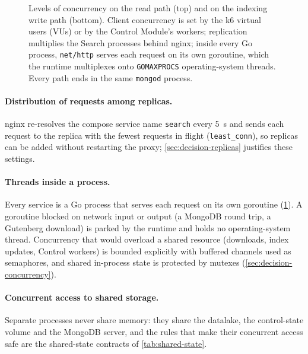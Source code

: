 \documentclass[10pt,a4paper]{article}
\newcommand{\code}[1]{\texttt{#1}}
\begin{document}
\begin{figure}[htbp]
  \caption{Levels of concurrency on the read path (top) and on the indexing
  write path (bottom). Client concurrency is set by the k6 virtual users (VUs)
  or by the Control Module's workers; replication multiplies the Search
  processes behind nginx; inside every Go process, \code{net/http} serves each
  request on its own goroutine, which the runtime multiplexes onto
  \code{GOMAXPROCS} operating-system threads. Every path ends in the same
  \code{mongod} process.}
  \label{fig:concurrency}
\end{figure}

\paragraph{Distribution of requests among replicas.}
nginx re-resolves the compose service name \code{search} every 5~s and sends
each request to the replica with the fewest requests in flight
(\code{least\_conn}), so replicas can be added without restarting the proxy;
\cref{sec:decision-replicas} justifies these settings.

\paragraph{Threads inside a process.}
Every service is a Go process that serves each request on its own goroutine
(\cref{fig:concurrency}). A goroutine blocked on network input or output (a
MongoDB round trip, a Gutenberg download) is parked by the runtime and holds no
operating-system thread. Concurrency that would overload a shared resource
(downloads, index updates, Control workers) is bounded explicitly with buffered
channels used as semaphores, and shared in-process state is protected by
mutexes (\cref{sec:decision-concurrency}).

\paragraph{Concurrent access to shared storage.}
Separate processes never share memory: they share the datalake, the
control-state volume and the MongoDB server, and the rules that make their
concurrent access safe are the shared-state contracts of
\cref{tab:shared-state}.
\end{document}
